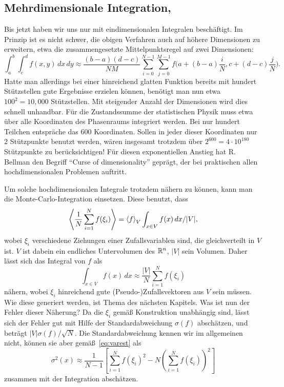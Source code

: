 \subsection{Mehrdimensionale Integration, }
\label{sec:mc}

Bis jetzt haben wir uns nur mit eindimensionalen Integralen
beschäftigt. Im Prinzip ist es nicht schwer, die obigen Verfahren auch
auf höhere Dimensionen zu erweitern, etwa die zusammengesetzte 
Mittelpunktsregel auf zwei Dimensionen:
\begin{equation}
  \int_a^b \int_c^d f(x, y)\, dx\, dy \approx
  \frac{(b-a)(d-c)}{NM} \sum_{i=0}^{N-1} \sum_{j=0}^{M-1}
  f\bigl(a + (b-a)\frac{i}{N}, c + (d-c)\frac{j}{N}\bigr).
\end{equation}
Hatte man allerdings bei einer hinreichend glatten Funktion bereits
mit hundert Stützstellen gute Ergebnisse erzielen können, benötigt man
nun etwa $100^2=10,000$ Stützstellen. Mit steigender Anzahl der
Dimensionen wird dies schnell unhandbar. Für die Zustandssumme der
statistischen Physik muss etwa über alle Koordinaten des Phasenraums
integriert werden. Bei nur hundert Teilchen entspräche das 600
Koordinaten. Sollen in jeder dieser Koordinaten nur 2 Stützpunkte
benutzt werden, wären insgesamt trotzdem über $2^{600}= 4\cdot
10^{180}$ Stützpunkte zu berücksichtigen! Für diesen exponentiellen
Anstieg hat R. Bellman den Begriff "`Curse of dimensionality"'
geprägt, der bei praktischen allen hochdimensionalen Problemen
auftritt.

Um solche hochdimensionalen Integrale trotzdem nähern zu können,
kann man die Monte-Carlo-Integration einsetzen. Diese benutzt, dass
\begin{equation}
  \left\langle{\frac{1}{N} \sum_{i=1}^N f(\xi_i)}\right\rangle = \left\langle{f}\right\rangle_{V}
  \int_{x\in V} f(x)\,dx / |V|,
\end{equation}
wobei $\xi_i$ verschiedene Ziehungen einer Zufallsvariablen sind, die
gleichverteilt in $V$ ist. $V$ ist dabein ein endliches Untervolumen
des $\mathbb{R}^n$, $|V|$ sein Volumen. Daher lässt sich das Integral von $f$
als
\begin{equation}
  \int_{x\in V} f(x)\,dx \approx \frac{|V|}{N} \sum_{i=1}^N f(\xi_i)
\end{equation}
nähern, wobei $\xi_i$ hinreichend gute (Pseudo-)Zufallsvektoren aus
$V$ sein müssen. Wie diese generiert werden, ist Thema des nächsten
Kapitels. Was ist nun der Fehler dieser Näherung? Da die $\xi_i$ gemäß
Konstruktion unabhängig sind, lässt sich der Fehler gut mit Hilfe der
Standardabweichung $\sigma(f)$ abschätzen, und beträgt
$|V|\sigma(f)/\sqrt{N}$. Die Standardabweichung kennen wir im
allgemeinen nicht, können sie aber gemäß~\eqref{eq:varest} als
\begin{equation}
  \sigma^2(x) \approx \frac{1}{N-1} \left[\sum_{i=1}^N f(\xi_i)^2 -
    N\left(\sum_{i=1}^Nf(\xi_i)\right)^2\right]
\end{equation}
zusammen mit der Integration abschätzen.

